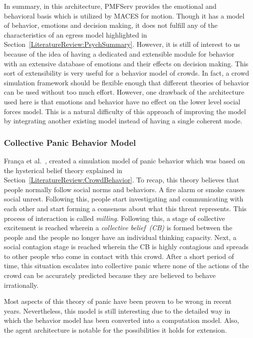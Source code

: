 In summary, in this architecture, PMFServ provides the emotional and behavioral basis which is utilized by MACES for motion. Though it has a model of behavior, emotions and decision making, it does not fulfill any of the characteristics of an egress model highlighted in Section~\ref{LiteratureReview:PsychSummary}. However, it is still of interest to us because of the idea of having a dedicated and extensible module for behavior with an extensive database of emotions and their effects on decision making. This sort of extensibility is very useful for a behavior model of crowds. In fact, a crowd simulation framework should be flexible enough that different theories of behavior can be used without too much effort. However, one drawback of the architecture used here is that emotions and behavior have no effect on the lower level social forces model. This is a natural difficulty of this approach of improving the model by integrating another existing model instead of having a single coherent mode.

\subsubsection{Collective Panic Behavior Model}

Fran{\c c}a et al.~\cite{Franca:2009wq}, created a simulation model of panic behavior which was based on the hysterical belief theory explained in Section~\ref{LiteratureReview:CrowdBehavior}. To recap, this theory believes that people normally follow social norms and behaviors. A fire alarm or smoke causes social unrest. Following this, people start investigating and communicating with each other and start forming a consensus about what this threat represents. This process of interaction is called \emph{milling}. Following this, a stage of collective excitement is reached wherein a \emph{collective belief~(CB)} is formed between the people and the people no longer have an individual thinking capacity. Next, a social contagion stage is reached wherein the CB is highly contagious and spreads to other people who come in contact with this crowd. After a short period of time, this situation escalates into collective panic where none of the actions of the crowd can be accurately predicted because they are believed to behave irrationally.

Most aspects of this theory of panic have been proven to be wrong in recent years. Nevertheless, this model is still interesting due to the detailed way in which the behavior model has been converted into a computation model. Also, the agent architecture is notable for the possibilities it holds for extension.

